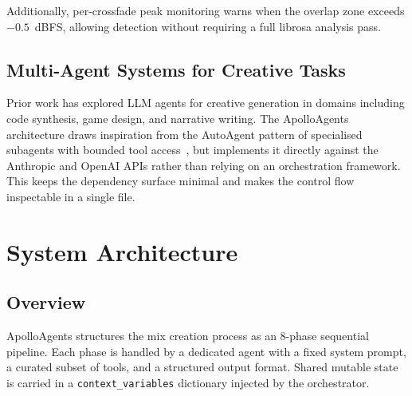 \documentclass[11pt,a4paper]{article}
\begin{document}
Additionally, per-crossfade peak monitoring warns when the overlap zone
exceeds $-0.5$~dBFS, allowing detection without requiring a full librosa
analysis pass.

\subsection{Multi-Agent Systems for Creative Tasks}

Prior work has explored LLM agents for creative generation in domains
including code synthesis, game design, and narrative writing. The
ApolloAgents architecture draws inspiration from the AutoAgent pattern of
specialised subagents with bounded tool access~\cite{autoagent}, but
implements it directly against the Anthropic and OpenAI APIs rather than
relying on an orchestration framework. This keeps the dependency surface
minimal and makes the control flow inspectable in a single file.

\section{System Architecture}

\subsection{Overview}

ApolloAgents structures the mix creation process as an 8-phase sequential
pipeline. Each phase is handled by a dedicated agent with a fixed system
prompt, a curated subset of tools, and a structured output format. Shared
mutable state is carried in a \texttt{context\_variables} dictionary injected
by the orchestrator.
\end{document}

